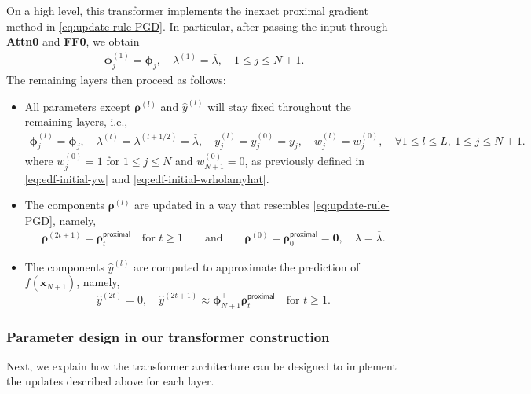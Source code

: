 \documentclass[english]{article}
\begin{document}
On a high level, this transformer implements the inexact proximal gradient method in \eqref{eq:update-rule-PGD}.
In particular, after passing the input through \textbf{Attn0} and \textbf{FF0}, we obtain
%
\begin{align*}
{\bm \phi}_j^{(1)} = {\bm \phi}_j,\quad \lambda^{(1)} = \overline{\lambda},\quad 1\le j\le N+1.
\end{align*}
%
The remaining layers then proceed as follows: 
%
\begin{itemize}
    \item All parameters except ${\bm \rho}^{(l)}$ and $\widehat{y}^{(l)}$ will stay fixed throughout the remaining layers, i.e.,  
%
\begin{align}
{\bm \phi}_j^{(l)} = {\bm \phi}_j,\quad \lambda^{(l)} = \lambda^{(l+1/2)} = \overline{\lambda},\quad y_j^{(l)} = y_j^{(0)} = y_j,\quad w_j^{(l)} = w_j^{(0)},\quad \forall 1\le l\le L,~  1\le j\le N+1.
\end{align}
where $w_j^{(0)} = 1$ for $1\le j\le N$ and $w_{N+1}^{(0)} = 0$, as previously defined in \eqref{eq:edf-initial-yw} and \eqref{eq:edf-initial-wrholamyhat}.
%

\item The components ${\bm \rho}^{(l)}$ are updated in a way that resembles \eqref{eq:update-rule-PGD}, namely, 
%
\begin{align}\label{eq:rela-rhol-rhot}
{\bm \rho}^{(2t+1)} = {\bm \rho}_t^{\mathsf{proximal}}\quad \text{for }t\ge 1  \qquad \text{and}\qquad {\bm \rho}^{(0)} = {\bm \rho}_0^{\mathsf{proximal}} = {\bm 0},\quad \lambda = \overline{\lambda}.
\end{align}

\item The components $\widehat{y}^{(l)}$ are computed to approximate the prediction of $f({\bm x}_{N+1})$, namely, 
$$
\widehat{y}^{(2t)} = 0,\quad \widehat{y}^{(2t+1)}\approx {\bm \phi}_{N+1}^{\top}{\bm \rho}_t^{\mathsf{proximal}}\quad \text{for }t\ge 1.
$$
\end{itemize}





\subsubsection{Parameter design in our transformer construction}
%
Next, we explain how the transformer architecture can be designed to implement the updates described above for each layer. 
\end{document}
